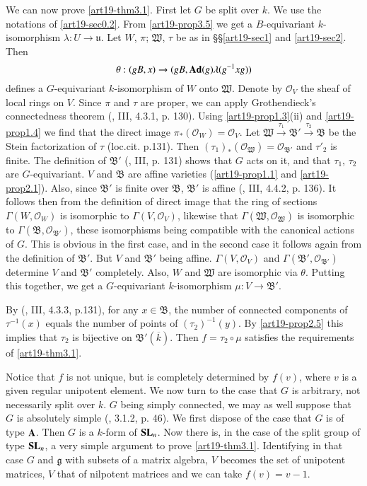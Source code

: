 We can now prove \ref{art19-thm3.1}. First let $G$ be split over $k$. We use the notations of \ref{art19-sec0.2}. From \ref{art19-prop3.5} we get a $B$-equivariant $k$-isomorphism $\lambda:U\to \mathfrak{u}$. Let $W$, $\pi$; $\mathfrak{W}$, $\tau$ be as in \S\S\ref{art19-sec1} and \ref{art19-sec2}. Then
$$
\theta:(gB,x)\to (gB,\mathbf{Ad}(g)\lambda(g^{-1}xg))
$$\pageoriginale
defines a $G$-equivariant $k$-isomorphism of $W$ onto $\mathfrak{W}$. Denote by $\mathcal{O}_{V}$ the sheaf of local rings on $V$. Since $\pi$ and $\tau$ are proper, we can apply Grothendieck's connectedness theorem (\cite{art19-key7}, III, 4.3.1, p. 130). Using \ref{art19-prop1.3}(ii) and \ref{art19-prop1.4} we find that the direct image
$\pi_{*}(\mathcal{O}_{W})=\mathcal{O}_{V}$. Let $\mathfrak{W}\xrightarrow{\tau_{1}}\mathfrak{B}'\xrightarrow{\tau_{2}}\mathfrak{B}$ be the Stein factorization of $\tau$ (loc.cit. p.131). Then $(\tau_{1})_{*}(\mathcal{O}_{\mathfrak{W}})=\mathcal{O}_{\mathfrak{B}'}$ and $\tau'_{2}$ is finite. The definition of $\mathfrak{B}'$ (\cite{art19-key7}, III, p. 131) shows that $G$ acts on it, and that $\tau_{1}$, $\tau_{2}$ are $G$-equivariant. $V$ and $\mathfrak{B}$ are affine varieties (\ref{art19-prop1.1} and \ref{art19-prop2.1}). Also, since $\mathfrak{B}'$ is finite over $\mathfrak{B}$, $\mathfrak{B}'$ is affine (\cite{art19-key7}, III, 4.4.2, p. 136). It follows then from the definition of direct image that the ring of sections $\Gamma(W,\mathcal{O}_{W})$ is isomorphic to $\Gamma(V,\mathcal{O}_{V})$, likewise that $\Gamma(\mathfrak{W},\mathcal{O}_{\mathfrak{W}})$ is isomorphic to $\Gamma(\mathfrak{B},\mathcal{O}_{\mathfrak{B}'})$, these isomorphisms being compatible with the canonical actions of $G$. This is obvious in the first case, and in the second case it follows again from the definition of $\mathfrak{B}'$. But $V$ and $\mathfrak{B}'$ being affine. $\Gamma(V,\mathcal{O}_{V})$ and $\Gamma(\mathfrak{B}',\mathcal{O}_{\mathfrak{B}'})$ determine $V$ and $\mathfrak{B}'$ completely. Also, $W$ and $\mathfrak{W}$ are isomorphic via $\theta$. Putting this together, we get a $G$-equivariant $k$-isomorphism $\mu:V\to \mathfrak{B}'$.

By (\cite{art19-key7}, III, 4.3.3, p.131), for any $x\in \mathfrak{B}$, the number of connected components of $\tau^{-1}(x)$ equals the number of points of $(\tau_{2})^{-1}(y)$. By \ref{art19-prop2.5} this implies that $\tau_{2}$ is bijective on $\mathfrak{B}'(\overline{k})$. Then $f=\tau_{2}\circ \mu$ satisfies the requirements of \ref{art19-thm3.1}.

Notice that $f$ is not unique, but is completely determined by $f(v)$, where $v$ is a given regular unipotent element. We now turn to the case that $G$ is arbitrary, not necessarily split over $k$. $G$ being simply connected, we may as well suppose that $G$ is absolutely simple (\cite{art19-key10}, 3.1.2, p. 46). We first dispose of the case that $G$ is of type $\mathbf{A}$. Then $G$ is a $k$-form of $\mathbf{S}\mathbf{L}_{n}$. Now there is, in the case of the split group of type $\mathbf{S}\mathbf{L}_{n}$, a very simple argument to prove \ref{art19-thm3.1}. Identifying in that case $G$ and $\mathfrak{g}$ with subsets of a matrix algebra, $V$ becomes the set of unipotent matrices, $V$ that of nilpotent matrices and we can take $f(v)=v-1$.

